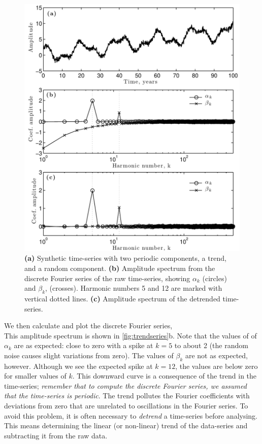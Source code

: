 \documentclass[11pt,twoside,a4paper]{article}
\begin{document}
\begin{figure}
  \centering
  \includegraphics[width=4.5in]{../figs/L16/TimeSerWithTrend}
  \caption{\textbf{(a)} Synthetic time-series with two periodic
    components, a trend, and a random component. \textbf{(b)}
    Amplitude spectrum from the discrete Fourier series of the raw
    time-series, showing $\alpha_k$ (circles) and $\beta_k$,
    (crosses). Harmonic numbers 5 and 12 are marked with vertical
    dotted lines. \textbf{(c)} Amplitude spectrum of the detrended
    time-series.\vspace{1cm}}
  \label{fig:trendseries}
\end{figure}

We then calculate and plot the discrete Fourier series,
\\[1mm]
This amplitude spectrum is shown in \autoref{fig:trendseries}b. Note
that the values of of $\alpha_k$ are as expected: close to zero with a
spike at $k=5$ to about 2 (the random noise causes slight variations
from zero).  The values of $\beta_k$ are not as expected, however.
Although we see the expected spike at $k=12$, the values are below
zero for smaller values of $k$.  This downward curve is a consequence
of the trend in the time-series; \textit{remember that to compute the
  discrete Fourier series, we assumed that the time-series is
  periodic}.  The trend pollutes the Fourier coefficients with
deviations from zero that are unrelated to oscillations in the Fourier
series. To avoid this problem, it is often necessary to
\textit{detrend} a time-series before analysing.  This means
determining the linear (or non-linear) trend of the data-series and
subtracting it from the raw data.
\end{document}
